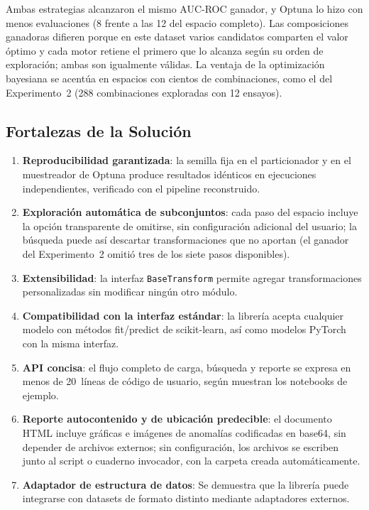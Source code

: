 \documentclass[conference,spanish]{IEEEtran}
\begin{document}
Ambas estrategias alcanzaron el mismo AUC-ROC ganador, y Optuna lo hizo
con menos evaluaciones (8 frente a las 12 del espacio completo). Las
composiciones ganadoras difieren porque en este dataset varios candidatos
comparten el valor óptimo y cada motor retiene el primero que lo alcanza
según su orden de exploración; ambas son igualmente válidas. La ventaja de
la optimización bayesiana se acentúa en espacios con cientos de
combinaciones, como el del Experimento~2 (288 combinaciones exploradas con
12 ensayos).

\subsection{Fortalezas de la Solución}

\begin{enumerate}
\item \textbf{Reproducibilidad garantizada}: la semilla fija en el
  particionador y en el muestreador de Optuna
  produce resultados idénticos en ejecuciones independientes, verificado
  con el pipeline reconstruido.
\item \textbf{Exploración automática de subconjuntos}: cada paso del
  espacio incluye la opción transparente de omitirse, sin configuración
  adicional del usuario; la búsqueda puede así descartar transformaciones
  que no aportan (el ganador del Experimento~2 omitió tres de los siete
  pasos disponibles).
\item \textbf{Extensibilidad}: la interfaz \texttt{BaseTransform} permite
  agregar transformaciones personalizadas sin modificar ningún otro
  módulo.
\item \textbf{Compatibilidad con la interfaz estándar}: la librería acepta
  cualquier modelo con métodos fit/predict de
  scikit-learn, así como modelos PyTorch con la misma interfaz.
\item \textbf{API concisa}: el flujo completo de carga, búsqueda y
  reporte se expresa en menos de 20~líneas de código de usuario, según
  muestran los notebooks de ejemplo.
\item \textbf{Reporte autocontenido y de ubicación predecible}: el
  documento HTML incluye gráficas e imágenes de anomalías codificadas en
  base64, sin depender de archivos externos; sin configuración, los
  archivos se escriben junto al script o cuaderno
  invocador, con la carpeta creada automáticamente.
\item \textbf{Adaptador de estructura de datos}: Se demuestra que la librería puede
  integrarse con datasets de formato distinto mediante adaptadores
  externos.
\end{enumerate}
\end{document}
